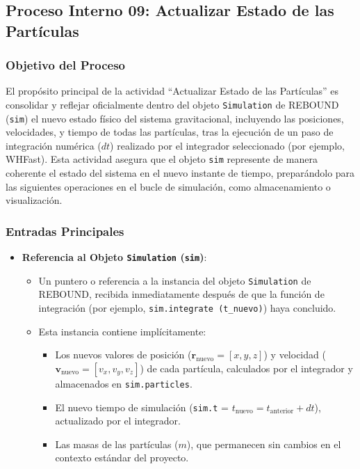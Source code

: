 \subsection[Proceso Interno 09: Actualizar Estado]{Proceso Interno 09: Actualizar Estado de las Partículas}

\subsubsection{Objetivo del Proceso}
El propósito principal de la actividad ``Actualizar Estado de las Partículas'' es consolidar y reflejar oficialmente dentro del objeto \texttt{Simulation} de REBOUND (\texttt{sim}) el nuevo estado físico del sistema gravitacional, incluyendo las posiciones, velocidades, y tiempo de todas las partículas, tras la ejecución de un paso de integración numérica ($dt$) realizado por el integrador seleccionado (por ejemplo, WHFast). Esta actividad asegura que el objeto \texttt{sim} represente de manera coherente el estado del sistema en el nuevo instante de tiempo, preparándolo para las siguientes operaciones en el bucle de simulación, como almacenamiento o visualización.

\subsubsection{Entradas Principales}
\begin{itemize}
    \item \textbf{Referencia al Objeto \texttt{Simulation} (\texttt{sim})}:
    \begin{itemize}
        \item Un puntero o referencia a la instancia del objeto \texttt{Simulation} de REBOUND, recibida inmediatamente después de que la función de integración (por ejemplo, \texttt{sim.integrate~(t\_nuevo)}) haya concluido.
        \item Esta instancia contiene implícitamente:
        \begin{itemize}
            \item Los nuevos valores de posición ($\mathbf{r}_{\text{nuevo}} = [x, y, z]$) y velocidad ($\mathbf{v}_{\text{nuevo}} = [v_x, v_y, v_z]$) de cada partícula, calculados por el integrador y almacenados en \texttt{sim.particles}.
            \item El nuevo tiempo de simulación (\texttt{sim.t} = $t_{\text{nuevo}} = t_{\text{anterior}} + dt$), actualizado por el integrador.
            \item Las masas de las partículas ($m$), que permanecen sin cambios en el contexto estándar del proyecto.
        \end{itemize}
    \end{itemize}
\end{itemize}

